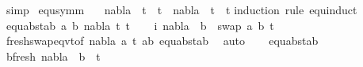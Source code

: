 \begin{isabellebody}
\ simp%
\endisatagproof
{\isafoldproof}%
%
\isadelimproof
\isanewline
%
\endisadelimproof
\isanewline
{}\isamarkupfalse%
\ equ{\isacharunderscore}{\kern0pt}symm{\isacharcolon}{\kern0pt}\isanewline
\ \ \ {\isachardoublequoteopen}{\isacharparenleft}{\kern0pt}nabla\ {\isasymturnstile}\ t{}\ {\isasymapprox}\ t{}{\isacharparenright}{\kern0pt}\ {\isasymLongrightarrow}\ {\isacharparenleft}{\kern0pt}nabla\ {\isasymturnstile}\ t{}\ {\isasymapprox}\ t{}{\isacharparenright}{\kern0pt}{\isachardoublequoteclose}\isanewline
%
\isadelimproof
%
\endisadelimproof
%
\isatagproof
{}\isamarkupfalse%
{\isacharparenleft}{\kern0pt}induction\ rule{\isacharcolon}{\kern0pt}\ equ{\isachardot}{\kern0pt}induct{\isacharparenright}{\kern0pt}\isanewline
\ \ \isamarkupfalse%
\ {\isacharparenleft}{\kern0pt}equ{\isacharunderscore}{\kern0pt}abst{\isacharunderscore}{\kern0pt}ab\ a\ b\ nabla\ t{}{\isacharprime}{\kern0pt}\ t{}{\isacharprime}{\kern0pt}{\isacharparenright}{\kern0pt}\isanewline
\ \ \isamarkupfalse%
\ i{\isacharcolon}{\kern0pt}\ {\isachardoublequoteopen}nabla\ {\isasymturnstile}\ b\ {\isasymsharp}\ swap\ {\isacharbrackleft}{\kern0pt}{\isacharparenleft}{\kern0pt}a{\isacharcomma}{\kern0pt}\ b{\isacharparenright}{\kern0pt}{\isacharbrackright}{\kern0pt}\ t{}{\isacharprime}{\kern0pt}{\isachardoublequoteclose}\ \isanewline
\ \ \ \ \isamarkupfalse%
\ fresh{\isacharunderscore}{\kern0pt}swap{\isacharunderscore}{\kern0pt}eqvt{\isacharbrackleft}{\kern0pt}of\ nabla\ a\ t{}{\isacharprime}{\kern0pt}\ {\isachardoublequoteopen}{\isacharbrackleft}{\kern0pt}{\isacharparenleft}{\kern0pt}a{\isacharcomma}{\kern0pt}b{\isacharparenright}{\kern0pt}{\isacharbrackright}{\kern0pt}{\isachardoublequoteclose}{\isacharbrackright}{\kern0pt}\ equ{\isacharunderscore}{\kern0pt}abst{\isacharunderscore}{\kern0pt}ab{\isacharparenleft}{\kern0pt}{}{\isacharparenright}{\kern0pt}\ \isamarkupfalse%
\ auto\isanewline
\ \ \isamarkupfalse%
\ equ{\isacharunderscore}{\kern0pt}abst{\isacharunderscore}{\kern0pt}ab{\isacharparenleft}{\kern0pt}{}{\isacharparenright}{\kern0pt}\ \isanewline
\ \ \isamarkupfalse%
\ b{\isacharunderscore}{\kern0pt}fresh{\isacharcolon}{\kern0pt}\ {\isachardoublequoteopen}nabla\ {\isasymturnstile}\ b\ {\isasymsharp}\ t{}{\isacharprime}{\kern0pt}{\isachardoublequoteclose}\isanewline
\ \ \ \ \isamarkupfalse%

\end{isabellebody}
